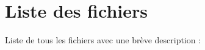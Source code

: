 \section{Liste des fichiers}
Liste de tous les fichiers avec une brève description \+:\begin{DoxyCompactList}
\item{}
\item{}
\end{DoxyCompactList}
